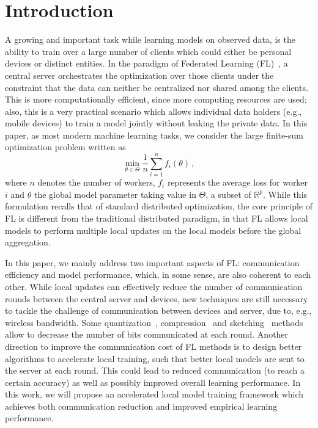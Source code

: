 \documentclass[manuscript,screen,review]{acmart}
\begin{document}
\section{Introduction}\label{sec:introduction}

A growing and important task while learning models on observed data, is the ability to train over a large number of clients which could either be personal devices or distinct entities.
In the paradigm of Federated Learning (FL)~\citep{konevcny2016federated,mcmahan2017communication}, a central server orchestrates the optimization over those clients under the constraint that the data can neither be centralized nor shared among the clients.
This is more computationally efficient, since more computing resources are used; also, this is a very practical scenario which allows individual data holders (e.g., mobile devices) to train a model jointly without leaking the private data. In this paper, as most modern machine learning tasks, we consider the large finite-sum optimization problem written as
\begin{equation}\label{eq:opt}
\min \limits_{\theta \in \Theta} \frac{1}{n} \sum_{i=1}^n f_i(\theta) \, ,
\end{equation}
where $n$ denotes the number of workers, $f_i$ represents the average loss for worker $i$ and $\theta$ the global model parameter taking value in $\Theta$, a subset of $\mathbb{R}^p$.
While this formulation recalls that of standard distributed optimization, the core principle of FL is different from the traditional distributed paradigm, in that FL allows local models to perform multiple local updates on the local models before the global aggregation.

In this paper, we mainly address two important aspects of FL: communication efficiency and model performance, which, in some sense, are also coherent to each other. While local updates can effectively reduce the number of communication rounds between the central server and devices, new techniques are still necessary to tackle the challenge of communication between devices and server, due to, e.g., wireless bandwidth.
Some quantization~\citep{alistarh2017qsgd, wangni2018gradient}, compression~\citep{lin2017deep} and sketching~\citep{Proc:Rothchild_ICML20} methods allow to decrease the number of bits communicated at each round. Another direction to improve the communication cost of FL methods is to design better algorithms to accelerate local training, such that better local models are sent to the server at each round. This could lead to reduced communication (to reach a certain accuracy) as well as possibly improved overall learning performance. In this work, we will propose an accelerated local model training framework which achieves both communication reduction and improved empirical learning performance.
\end{document}
